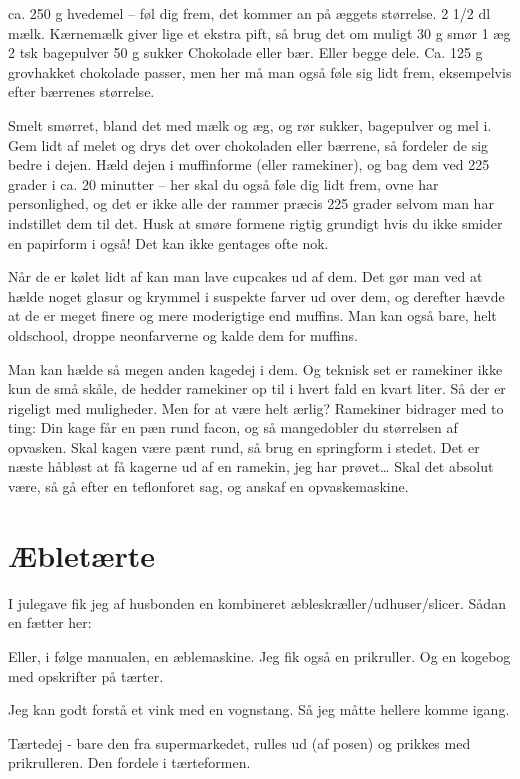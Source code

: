 \documentclass[
]{book}
\begin{document}
ca. 250 g hvedemel -- føl dig frem, det kommer an på æggets størrelse.
2 1/2 dl mælk. Kærnemælk giver lige et ekstra pift, så brug det om muligt
30 g smør
1 æg
2 tsk bagepulver
50 g sukker
Chokolade eller bær. Eller begge dele. Ca. 125 g grovhakket chokolade passer, men her må man også føle sig lidt frem, eksempelvis efter bærrenes størrelse.

Smelt smørret, bland det med mælk og æg, og rør sukker, bagepulver og mel i. Gem lidt af melet og drys det over chokoladen eller bærrene, så fordeler de sig bedre i dejen. Hæld dejen i muffinforme (eller ramekiner), og bag dem ved 225 grader i ca. 20 minutter -- her skal du også føle dig lidt frem, ovne har personlighed, og det er ikke alle der rammer præcis 225 grader selvom man har indstillet dem til det. Husk at smøre formene rigtig grundigt hvis du ikke smider en papirform i også! Det kan ikke gentages ofte nok.

Når de er kølet lidt af kan man lave cupcakes ud af dem. Det gør man ved at hælde noget glasur og krymmel i suspekte farver ud over dem, og derefter hævde at de er meget finere og mere moderigtige end muffins. Man kan også bare, helt oldschool, droppe neonfarverne og kalde dem for muffins.~

Man kan hælde så megen anden kagedej i dem. Og teknisk set er ramekiner ikke kun de små skåle, de hedder ramekiner op til i hvert fald en kvart liter. Så der er rigeligt med muligheder. Men for at være helt ærlig? Ramekiner bidrager med to ting: Din kage får en pæn rund facon, og så mangedobler du størrelsen af opvasken. Skal kagen være pænt rund, så brug en springform i stedet. Det er næste håbløst at få kagerne ud af en ramekin, jeg har prøvet\ldots{} Skal det absolut være, så gå efter en teflonforet sag, og anskaf en opvaskemaskine.

\hypertarget{uxe6bletuxe6rte}{%
\section{Æbletærte}\label{uxe6bletuxe6rte}}

I julegave fik jeg af husbonden en kombineret æbleskræller/udhuser/slicer. Sådan en fætter her:

Eller, i følge manualen, en æblemaskine. Jeg fik også en prikruller. Og en kogebog med opskrifter på tærter.

Jeg kan godt forstå et vink med en vognstang. Så jeg måtte hellere komme igang.

Tærtedej - bare den fra supermarkedet, rulles ud (af posen) og prikkes med prikrulleren. Den fordele i tærteformen.
\end{document}
